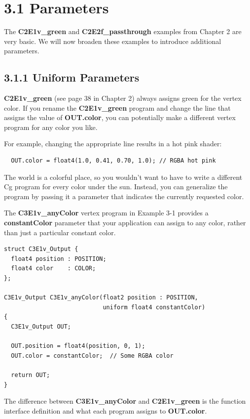 \documentclass{book}
\begin{document}
\section{3.1 Parameters}

The \textbf{C2E1v_green} and \textbf{C2E2f_passthrough} examples from Chapter 2 are very basic. We will now broaden these examples to introduce additional parameters.

\subsection{3.1.1 Uniform Parameters}

\textbf{C2E1v_green} (see page 38 in Chapter 2) always assigns green for the vertex color. If you rename the \textbf{C2E1v_green} program and change the line that assigns the value of \textbf{OUT.color}, you can potentially make a different vertex program for any color you like.

For example, changing the appropriate line results in a hot pink shader:

\FloatBarrier
\begin{lstlisting}
  OUT.color = float4(1.0, 0.41, 0.70, 1.0); // RGBA hot pink
\end{lstlisting}
\FloatBarrier

The world is a colorful place, so you wouldn't want to have to write a different Cg program for every color under the sun. Instead, you can generalize the program by passing it a parameter that indicates the currently requested color.

The \textbf{C3E1v_anyColor} vertex program in Example 3-1 provides a \textbf{constantColor} parameter that your application can assign to any color, rather than just a particular constant color.

\FloatBarrier
\begin{lstlisting}[caption=Example 3-1. The \textbf{C3E1v_anyColor} Vertex Program]
struct C3E1v_Output {
  float4 position : POSITION;
  float4 color    : COLOR;
};

C3E1v_Output C3E1v_anyColor(float2 position : POSITION,
                            uniform float4 constantColor)
{
  C3E1v_Output OUT;

  OUT.position = float4(position, 0, 1);
  OUT.color = constantColor;  // Some RGBA color

  return OUT;
}
\end{lstlisting}
\FloatBarrier

The difference between \textbf{C3E1v_anyColor} and \textbf{C2E1v_green} is the function interface definition and what each program assigns to \textbf{OUT.color}.
\end{document}
